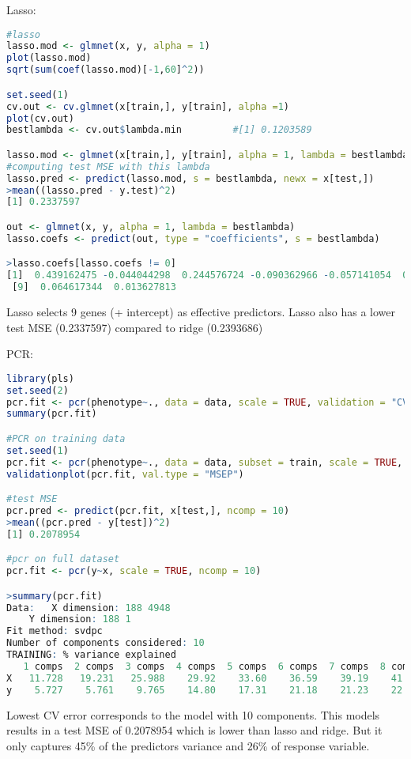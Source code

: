 \documentclass[11pt]{article}
\begin{document}
Lasso:
\begin{lstlisting}[language=R, breaklines=true, basicstyle=\ttfamily]
#lasso
lasso.mod <- glmnet(x, y, alpha = 1)
plot(lasso.mod)
sqrt(sum(coef(lasso.mod)[-1,60]^2))

set.seed(1)
cv.out <- cv.glmnet(x[train,], y[train], alpha =1)
plot(cv.out)
bestlambda <- cv.out$lambda.min         #[1] 0.1203589

lasso.mod <- glmnet(x[train,], y[train], alpha = 1, lambda = bestlambda)
#computing test MSE with this lambda
lasso.pred <- predict(lasso.mod, s = bestlambda, newx = x[test,])
>mean((lasso.pred - y.test)^2)
[1] 0.2337597

out <- glmnet(x, y, alpha = 1, lambda = bestlambda)
lasso.coefs <- predict(out, type = "coefficients", s = bestlambda)

>lasso.coefs[lasso.coefs != 0]
[1]  0.439162475 -0.044044298  0.244576724 -0.090362966 -0.057141054  0.135838330  0.033935840  0.009716377
 [9]  0.064617344  0.013627813
\end{lstlisting}
Lasso selects 9 genes (+ intercept) as effective predictors.
Lasso also has a lower test MSE (0.2337597) compared to ridge (0.2393686)

PCR:
\begin{lstlisting}[language=R, breaklines=true, basicstyle=\ttfamily]
library(pls)
set.seed(2)
pcr.fit <- pcr(phenotype~., data = data, scale = TRUE, validation = "CV")
summary(pcr.fit)

#PCR on training data
set.seed(1)
pcr.fit <- pcr(phenotype~., data = data, subset = train, scale = TRUE, validation = "CV")
validationplot(pcr.fit, val.type = "MSEP")

#test MSE
pcr.pred <- predict(pcr.fit, x[test,], ncomp = 10)
>mean((pcr.pred - y[test])^2)
[1] 0.2078954

#pcr on full dataset
pcr.fit <- pcr(y~x, scale = TRUE, ncomp = 10)

>summary(pcr.fit)
Data: 	X dimension: 188 4948 
	Y dimension: 188 1
Fit method: svdpc
Number of components considered: 10
TRAINING: % variance explained
   1 comps  2 comps  3 comps  4 comps  5 comps  6 comps  7 comps  8 comps  9 comps  10 comps
X   11.728   19.231   25.988    29.92    33.60    36.59    39.19    41.72    43.59     45.28
y    5.727    5.761    9.765    14.80    17.31    21.18    21.23    22.12    22.43     25.59
\end{lstlisting}

Lowest CV error corresponds to the model with 10 components. This models results in a test MSE of 0.2078954 which is lower than lasso and ridge. But it only captures 45\% of the predictors variance and 26\% of response variable.
\end{document}
